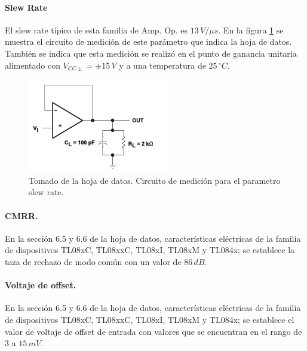 \documentclass{article}
\newcommand{\unidad}[1]{\,\si{#1}}
\begin{document}
	\paragraph{Slew Rate}
	El slew rate típico de esta familia de Amp. Op. es $13 \unidad{V/\mu s}$. En la figura \ref{fig:figura19_tl084} se muestra el circuito de medición de este parámetro que indica la hoja de datos. También se indica que esta medición se realizó en el punto de ganancia unitaria alimentado con $V_{CC \pm} = \pm 15 \unidad{V} $ y a una temperatura de $25 \unidad{^{\circ} C}$.
	
	\begin{figure}[h!]
		\centering
		\includegraphics[scale=1]{img/figura19_tl084}
		\caption{Tomado de la hoja de datos. Circuito de medición para el parametro slew rate.}
		\label{fig:figura19_tl084}
	\end{figure}
	\paragraph{CMRR.}
	En la sección 6.5 y 6.6 de la hoja de datos, características eléctricas de la familia de dispositivos TL08xC, TL08xxC, TL08xI, TL08xM y TL084x; se establece la taza de rechazo de modo común con un valor de $86\unidad{dB}$.
	\paragraph{Voltaje de offset.}
	En la sección 6.5 y 6.6 de la hoja de datos, características eléctricas de la familia de dispositivos TL08xC, TL08xxC, TL08xI, TL08xM y TL084x; se establece el valor de voltaje de offset de entrada con valores que se encuentran en el rango de $3$ a $15 \unidad{mV}$.
\end{document}
